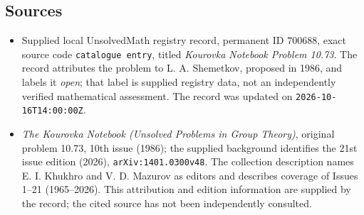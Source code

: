 \documentclass[11pt]{article}
\begin{document}
\subsection{Sources}
\begin{itemize}
\item Supplied local UnsolvedMath registry record, permanent ID \(700688\), exact source code \texttt{catalogue entry}, titled \emph{Kourovka Notebook Problem 10.73}. The record attributes the problem to L. A. Shemetkov, proposed in 1986, and labels it \emph{open}; that label is supplied registry data, not an independently verified mathematical assessment. The record was updated on \texttt{2026-10-16T14:00:00Z}.
\item \emph{The Kourovka Notebook (Unsolved Problems in Group Theory)}, original problem 10.73, 10th issue (1986); the supplied background identifies the 21st issue edition (2026), \texttt{arXiv:1401.0300v48}. The collection description names E. I. Khukhro and V. D. Mazurov as editors and describes coverage of Issues 1--21 (1965--2026). This attribution and edition information are supplied by the record; the cited source has not been independently consulted.
\end{itemize}
\end{document}
